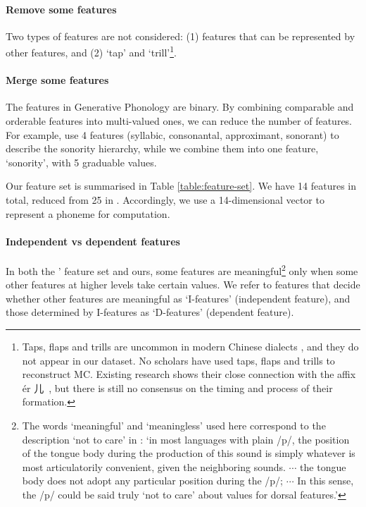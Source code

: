 \paragraph{Remove some features} 
Two types of features are not considered: (1) features that can be represented by other features, and (2) `tap' and `trill'\footnote{Taps, flaps and trills are uncommon in modern Chinese dialects \citep{zhuxiaonong-liquid}, and they do not appear in our dataset. 
No scholars have used taps, flaps and trills to reconstruct MC.
Existing research shows their close connection with the affix \'er 儿~\citep{trill-in-HB-2019}, but there is still no consensus on the timing and process of their formation.}. 

\paragraph{Merge some features}
The features in Generative Phonology are binary. 
By combining comparable and orderable features into multi-valued ones, we can reduce the number of features. 
For example, \citet{hayes2011} use 4 features (syllabic, consonantal, approximant, sonorant) to describe the sonority hierarchy, while we combine them into one feature, `sonority', with 5 graduable values. 

Our feature set is summarised in Table \ref{table:feature-set}. 
We have 14 features in total, reduced from 25 in \citet{hayes2011}. 
Accordingly, we use a 14-dimensional vector to represent a phoneme for computation. 

\paragraph{Independent vs dependent features}
In both the \citeauthor{hayes2011}' feature set and ours, some features are meaningful\footnote{The words `meaningful' and `meaningless' used here correspond to the description `not to care' in \citet[p.91]{hayes2011}: `in most languages with plain /p/, the position of the tongue body during the production of this sound is simply whatever is most articulatorily convenient, given the neighboring sounds. $\cdots$ the tongue body does not adopt any particular position during the /p/; $\cdots$ In this sense, the /p/ could be said truly `not to care' about values for dorsal features.'}
only when some other features at higher levels take certain values. 
We refer to features that decide whether other features are meaningful as `I-features' (independent feature), 
  and those determined by I-features as `D-features' (dependent feature).  


